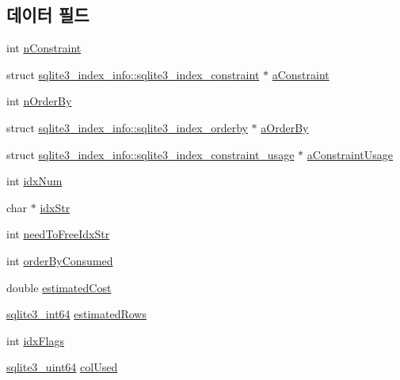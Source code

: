 \subsection*{데이터 필드}
\begin{DoxyCompactItemize}
\item 
int \hyperlink{structsqlite3__index__info_ae861993a30ce914a5214eab2579d935a}{n\+Constraint}
\item 
struct \hyperlink{structsqlite3__index__info_1_1sqlite3__index__constraint}{sqlite3\+\_\+index\+\_\+info\+::sqlite3\+\_\+index\+\_\+constraint} $\ast$ \hyperlink{structsqlite3__index__info_a634aa93834e2b47acf34454746c0f248}{a\+Constraint}
\item 
int \hyperlink{structsqlite3__index__info_a3ef850fdc57eddbc8189fe84d0a9044e}{n\+Order\+By}
\item 
struct \hyperlink{structsqlite3__index__info_1_1sqlite3__index__orderby}{sqlite3\+\_\+index\+\_\+info\+::sqlite3\+\_\+index\+\_\+orderby} $\ast$ \hyperlink{structsqlite3__index__info_a6823a68979e19d8e332389361e920ef9}{a\+Order\+By}
\item 
struct \hyperlink{structsqlite3__index__info_1_1sqlite3__index__constraint__usage}{sqlite3\+\_\+index\+\_\+info\+::sqlite3\+\_\+index\+\_\+constraint\+\_\+usage} $\ast$ \hyperlink{structsqlite3__index__info_a79b8a969dd7d582fc2ea3c0fbc5adb56}{a\+Constraint\+Usage}
\item 
int \hyperlink{structsqlite3__index__info_afcee17707a1c147fbd55c23c807fdae3}{idx\+Num}
\item 
char $\ast$ \hyperlink{structsqlite3__index__info_a1a9935e997bd6e3cce048534da7506a7}{idx\+Str}
\item 
int \hyperlink{structsqlite3__index__info_a5410066c067c3891cdf165c70cc4d6b1}{need\+To\+Free\+Idx\+Str}
\item 
int \hyperlink{structsqlite3__index__info_a5515d9de0f37f68d7e0930c20a668b29}{order\+By\+Consumed}
\item 
double \hyperlink{structsqlite3__index__info_aa8b4fe1d2ee38aab57ba5e1da00d7830}{estimated\+Cost}
\item 
\hyperlink{sqlite3_8h_a0a4d3e6c1ad46f90e746b920ab6ca0d2}{sqlite3\+\_\+int64} \hyperlink{structsqlite3__index__info_adcdf25dcf9848a6fedf539bb9c921b7f}{estimated\+Rows}
\item 
int \hyperlink{structsqlite3__index__info_a8acf2a7efbc3e193cf01d2afbd44fdbb}{idx\+Flags}
\item 
\hyperlink{sqlite3_8h_a181c20ecfd72bc6627635746d382c610}{sqlite3\+\_\+uint64} \hyperlink{structsqlite3__index__info_a99787169e2f78c0728bdb339c4107a2e}{col\+Used}
\end{DoxyCompactItemize}


